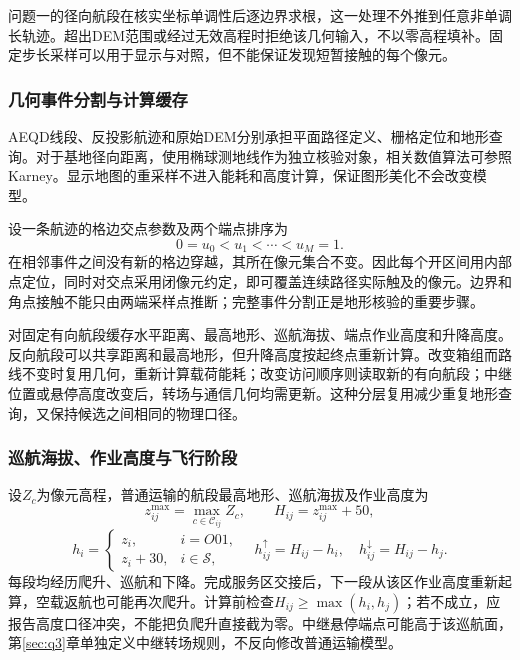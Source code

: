 \documentclass[withoutpreface,colorprint]{format}
\numberwithin{equation}{section}
\numberwithin{figure}{section}
\numberwithin{table}{section}
\begin{document}
问题一的径向航段在核实坐标单调性后逐边界求根，这一处理不外推到任意非单调长轨迹。超出DEM范围或经过无效高程时拒绝该几何输入，不以零高程填补。固定步长采样可以用于显示与对照，但不能保证发现短暂接触的每个像元。


\subsubsection{几何事件分割与计算缓存}
AEQD线段、反投影航迹和原始DEM分别承担平面路径定义、栅格定位和地形查询。对于基地径向距离，使用椭球测地线作为独立核验对象，相关数值算法可参照Karney\cite{karney2013}。显示地图的重采样不进入能耗和高度计算，保证图形美化不会改变模型。

设一条航迹的格边交点参数及两个端点排序为
\begin{equation}
0=u_0<u_1<\cdots<u_M=1.
\label{eq:geometry_breakpoints}
\end{equation}
在相邻事件之间没有新的格边穿越，其所在像元集合不变。因此每个开区间用内部点定位，同时对交点采用闭像元约定，即可覆盖连续路径实际触及的像元。边界和角点接触不能只由两端采样点推断；完整事件分割正是地形核验的重要步骤。

对固定有向航段缓存水平距离、最高地形、巡航海拔、端点作业高度和升降高度。反向航段可以共享距离和最高地形，但升降高度按起终点重新计算。改变箱组而路线不变时复用几何，重新计算载荷能耗；改变访问顺序则读取新的有向航段；中继位置或悬停高度改变后，转场与通信几何均需更新。这种分层复用减少重复地形查询，又保持候选之间相同的物理口径。


\subsubsection{巡航海拔、作业高度与飞行阶段}
设$Z_c$为像元高程，普通运输的航段最高地形、巡航海拔及作业高度为
\begin{equation}
 z_{ij}^{\max}=\max_{c\in\mathcal C_{ij}}Z_c,\qquad H_{ij}=z_{ij}^{\max}+50,
\label{eq:common_cruise_altitude}
\end{equation}
\begin{equation}
 h_i=\begin{cases}z_i,&i=O01,\\z_i+30,&i\in\mathcal S,\end{cases}
 \quad h_{ij}^{\uparrow}=H_{ij}-h_i,\quad h_{ij}^{\downarrow}=H_{ij}-h_j.
\label{eq:common_work_height}
\end{equation}
每段均经历爬升、巡航和下降。完成服务区交接后，下一段从该区作业高度重新起算，空载返航也可能再次爬升。计算前检查$H_{ij}\ge\max(h_i,h_j)$；若不成立，应报告高度口径冲突，不能把负爬升直接截为零。中继悬停端点可能高于该巡航面，第\ref{sec:q3}章单独定义中继转场规则，不反向修改普通运输模型。
\end{document}
